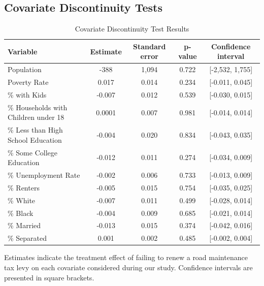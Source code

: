 \clearpage

\subsection{Covariate Discontinuity Tests}

\begin{table}[!h]
    \centering
    \caption{Covariate Discontinuity Test Results}
    \label{tab:covariate_discontinuity}
    \begin{tabular}{p{2cm}cccc}
        \hline
        Variable & Estimate & Standard error & p-value & Confidence interval \\
        \hline
        Population                           & -388      & 1,094   & 0.722  & [-2,532, 1,755] \\
        Poverty Rate                         & 0.017     & 0.014   & 0.234  & [-0.011, 0.045] \\
        \% with Kids                         & -0.007    & 0.012   & 0.539  & [-0.030, 0.015] \\
        \% Households with Children under 18 & 0.0001    & 0.007   & 0.981  & [-0.014, 0.014] \\
        \% Less than High School Education   & -0.004    & 0.020   & 0.834  & [-0.043, 0.035] \\
        \% Some College Education            & -0.012    & 0.011   & 0.274  & [-0.034, 0.009] \\
        \% Unemployment Rate                 & -0.002    & 0.006   & 0.733  & [-0.013, 0.009] \\
        \% Renters                           & -0.005    & 0.015   & 0.754  & [-0.035, 0.025] \\
        \% White                             & -0.007    & 0.011   & 0.499  & [-0.028, 0.014] \\
        \% Black                             & -0.004    & 0.009   & 0.685  & [-0.021, 0.014] \\
        \% Married                           & -0.013    & 0.015   & 0.374  & [-0.042, 0.016] \\
        \% Separated                         & 0.001     & 0.002   & 0.485  & [-0.002, 0.004] \\
        \hline
    \end{tabular}
    \begin{tablenotes}
        \small
        \item Estimates indicate the treatment effect of failing to renew a road maintenance tax levy on each covariate considered during our study. Confidence intervals are presented in square brackets.
    \end{tablenotes}
\end{table}

